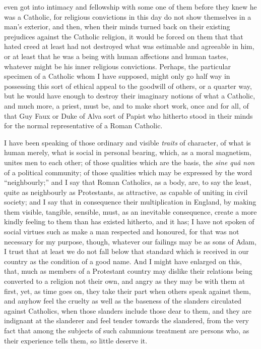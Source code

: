 even got into intimacy and fellowship with some one of them before
they knew he was a Catholic, for religious convictions in this day do
not show themselves in a man's exterior, and then, when their minds
turned back on their existing prejudices against the Catholic
religion, it would be forced on them that that hated creed at least
had not destroyed what was estimable and agreeable in him, or at least
that he was a being with human affections and human tastes, whatever
might be his inner religious convictions. Perhaps, the particular
specimen of a Catholic whom I have supposed, might only go half way in
possessing this sort of ethical appeal to the goodwill of others, or a
quarter way, but he would have enough to destroy their imaginary
notions of what a Catholic, and much more, a priest, must be, and to
make short work, once and for all, of that Guy Faux or Duke of Alva
sort of Papist who hitherto stood in their minds for the normal
representative of a Roman Catholic.

I have been speaking of those ordinary and visible \emph{traits} of
character, of what is human merely, what is social in personal
bearing, which, as a moral magnetism, unites men to each other; of
those qualities which are the basis, the \emph{sine quâ non} of a
political community; of those qualities which may be expressed by the
word ``neighbourly;'' and I say that Roman Catholics, as a
body, are, to say the least, quite as neighbourly as Protestants, as
attractive, as capable of uniting in civil society; and I say that in
consequence their multiplication in England, by making them visible,
tangible, sensible, must, as an inevitable consequence, create a more
kindly feeling to them than has existed hitherto, and it has; I have
not spoken of social virtues such as make a man respected and honoured,
for that was not necessary for my purpose, though, whatever our
failings may be as sons of Adam, I trust that at least we do not fall
below that standard which is received in our country as the
condition of a good name. And I might have enlarged on this, that,
much as members of a Protestant country may dislike their relations
being converted to a religion not their own, and angry as they may be
with them at first, yet, as time goes on, they take their part when
others speak against them, and anyhow feel the cruelty as well as the
baseness of the slanders circulated against Catholics, when those
slanders include those dear to them, and they are indignant at the
slanderer and feel tender towards the slandered, from the very fact
that among the subjects of such calumnious treatment are persons who,
as their experience tells them, so little deserve it.

